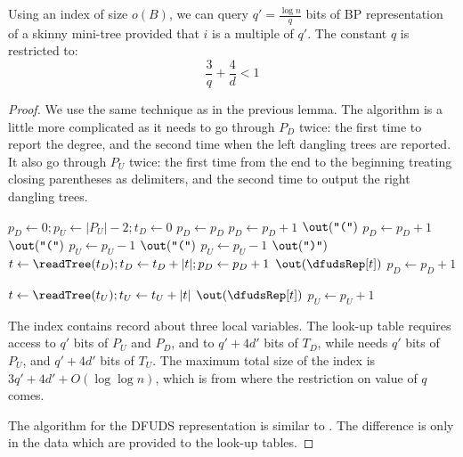\begin{lemma}\label{l:usr-dfuds-skinny}
	Using an index of size $o(B)$, we can query $q' = \frac{\log n}{q}$ bits of BP representation of a skinny mini-tree provided that $i$ is a multiple of $q'$.
	The constant $q$ is restricted to:
	$$\frac{3}{q} + \frac{4}{d} < 1$$
\end{lemma}
\begin{proof}
	We use the same technique as in the previous lemma.
	The algorithm is a little more complicated as it needs to go through $P_D$ twice: the first time to report the degree, and the second time when the left dangling trees are reported.
	It also go through $P_U$ twice: the first time from the end to the beginning treating closing parentheses as delimiters, and the second time to output the right dangling trees.
	
	\begin{algorithm}
	\begin{algorithmic}
	\Function{\dfudsSkinnyDown}{}
		\State $p_D \gets 0;  p_U \gets |P_U| - 2; t_D \gets 0$
			\State $p_D \gets p_D$ 
			 
				\State $p_D \gets p_D + 1$
				\State $\out(\openingParen)$
			\EndWhile
			\State $p_D \gets p_D + 1$ 
			 
				\State $\out(\openingParen)$
			\EndIf
			 
				\State $p_U \gets p_U - 1$
				\State $\out(\openingParen)$
			\EndWhile
			\State $p_U \gets p_U - 1$ 
			\State $\out(\closingParen)$ 
			 
				\State $t \gets \readTree(t_D); t_D \gets t_D + |t|; p_D \gets p_D + 1$
				\State $\out(\dfudsRep[t])$
			\EndWhile
			\State $p_D \gets p_D + 1$ 
		\EndWhile
	\EndFunction
	
	\Function{\dfudsSkinnyDown}{}
		 
				\State $t \gets \readTree(t_U); t_U \gets t_U + |t|$
				\State $\out(\dfudsRep[t])$
			\EndIf
			\State $p_U \gets p_U + 1$ 
		\EndWhile
	\EndFunction
	\end{algorithmic}
	\end{algorithm}
	
	The index contains record about three local variables.
	The look-up table \dfudsSkinnyDown{} requires access to $q'$ bits of $P_U$ and $P_D$, and to $q' + 4d'$ bits of $T_D$, while \dfudsSkinnyDown{} needs $q'$ bits of $P_U$, and $q' + 4d'$ bits of $T_U$.
	The maximum total size of the index is $3q' + 4d' + O(\log \log n)$, which is from where the restriction on value of $q$ comes.	
	
	The algorithm \dfudsSubstringSkinny{} for the DFUDS representation is similar to \bpSubstringSkinny{}.
	The difference is only in the data which are provided to the look-up tables.
\end{proof}

